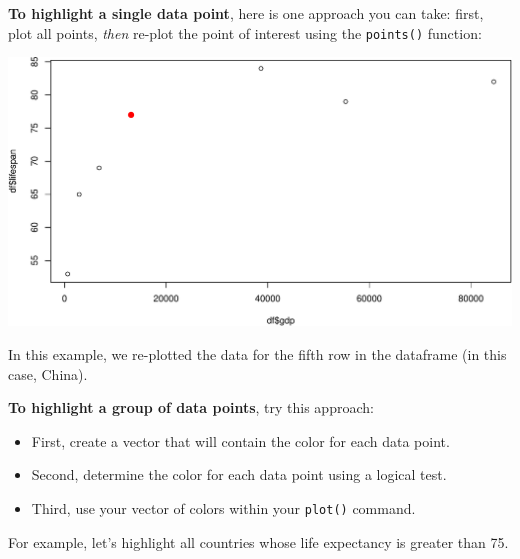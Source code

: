 \documentclass[
]{book}
\newenvironment{Shaded}{\begin{snugshade}}{\end{snugshade}}
\newcommand{\DataTypeTok}[1]{\textcolor[rgb]{0.13,0.29,0.53}{#1}}
\newcommand{\DecValTok}[1]{\textcolor[rgb]{0.00,0.00,0.81}{#1}}
\newcommand{\FloatTok}[1]{\textcolor[rgb]{0.00,0.00,0.81}{#1}}
\newcommand{\KeywordTok}[1]{\textcolor[rgb]{0.13,0.29,0.53}{\textbf{#1}}}
\newcommand{\NormalTok}[1]{#1}
\newcommand{\OperatorTok}[1]{\textcolor[rgb]{0.81,0.36,0.00}{\textbf{#1}}}
\newcommand{\StringTok}[1]{\textcolor[rgb]{0.31,0.60,0.02}{#1}}
\begin{document}
\textbf{To highlight a single data point}, here is one approach you can take: first, plot all points, \emph{then} re-plot the point of interest using the \texttt{points()} function:

\begin{Shaded}
\end{Shaded}

\includegraphics{figures/unnamed-chunk-121-1.pdf}

In this example, we re-plotted the data for the fifth row in the dataframe (in this case, China).

\textbf{To highlight a group of data points}, try this approach:

\begin{itemize}
\item
  First, create a vector that will contain the color for each data point.
\item
  Second, determine the color for each data point using a logical test.
\item
  Third, use your vector of colors within your \texttt{plot()} command.
\end{itemize}

For example, let's highlight all countries whose life expectancy is greater than 75.
\end{document}
